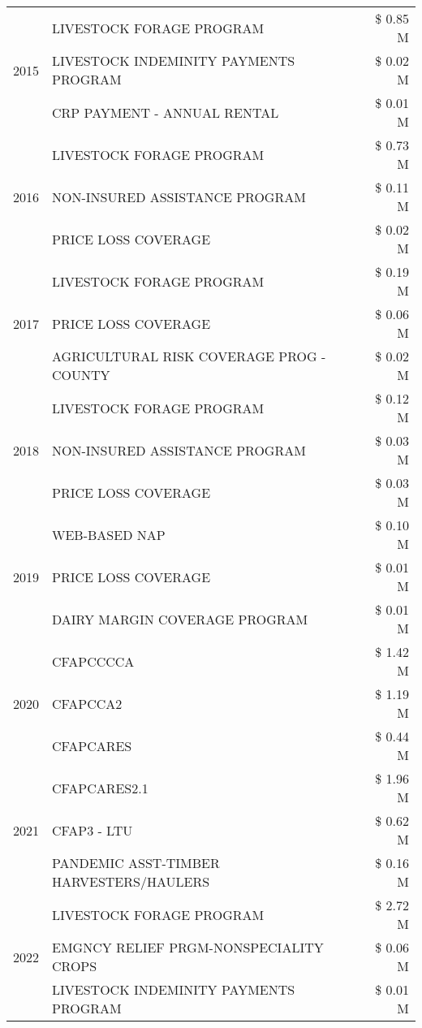 \begin{tabular}{llr}
\cline{1-3}
\multirow[t]{3}{*}{2015} & LIVESTOCK FORAGE PROGRAM & \$ 0.85 M \\
 & LIVESTOCK INDEMINITY PAYMENTS PROGRAM & \$ 0.02 M \\
 & CRP PAYMENT - ANNUAL RENTAL & \$ 0.01 M \\
\cline{1-3}
\multirow[t]{3}{*}{2016} & LIVESTOCK FORAGE PROGRAM & \$ 0.73 M \\
 & NON-INSURED ASSISTANCE PROGRAM & \$ 0.11 M \\
 & PRICE LOSS COVERAGE & \$ 0.02 M \\
\cline{1-3}
\multirow[t]{3}{*}{2017} & LIVESTOCK FORAGE PROGRAM & \$ 0.19 M \\
 & PRICE LOSS COVERAGE & \$ 0.06 M \\
 & AGRICULTURAL RISK COVERAGE PROG - COUNTY & \$ 0.02 M \\
\cline{1-3}
\multirow[t]{3}{*}{2018} & LIVESTOCK FORAGE PROGRAM & \$ 0.12 M \\
 & NON-INSURED ASSISTANCE PROGRAM & \$ 0.03 M \\
 & PRICE LOSS COVERAGE & \$ 0.03 M \\
\cline{1-3}
\multirow[t]{3}{*}{2019} & WEB-BASED NAP & \$ 0.10 M \\
 & PRICE LOSS COVERAGE & \$ 0.01 M \\
 & DAIRY MARGIN COVERAGE PROGRAM & \$ 0.01 M \\
\cline{1-3}
\multirow[t]{3}{*}{2020} & CFAPCCCCA & \$ 1.42 M \\
 & CFAPCCA2 & \$ 1.19 M \\
 & CFAPCARES & \$ 0.44 M \\
\cline{1-3}
\multirow[t]{3}{*}{2021} & CFAPCARES2.1 & \$ 1.96 M \\
 & CFAP3 - LTU & \$ 0.62 M \\
 & PANDEMIC ASST-TIMBER HARVESTERS/HAULERS & \$ 0.16 M \\
\cline{1-3}
\multirow[t]{3}{*}{2022} & LIVESTOCK FORAGE PROGRAM & \$ 2.72 M \\
 & EMGNCY RELIEF PRGM-NONSPECIALITY CROPS & \$ 0.06 M \\
 & LIVESTOCK INDEMINITY PAYMENTS PROGRAM & \$ 0.01 M \\
\cline{1-3}
\bottomrule
\end{tabular}
